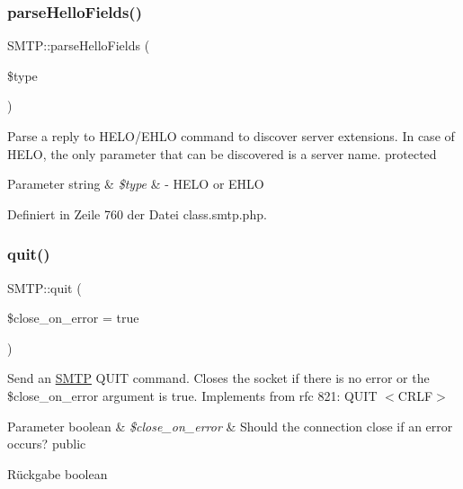 \subsubsection{\texorpdfstring{parse\+Hello\+Fields()}{parseHelloFields()}}
{\footnotesize\ttfamily S\+M\+T\+P\+::parse\+Hello\+Fields (\begin{DoxyParamCaption}\item[{}]{\$type }\end{DoxyParamCaption})\hspace{0.3cm}{\ttfamily [protected]}}

Parse a reply to H\+E\+L\+O/\+E\+H\+LO command to discover server extensions. In case of H\+E\+LO, the only parameter that can be discovered is a server name.  protected 
\begin{DoxyParams}[1]{Parameter}
string & {\em \$type} & -\/ \textquotesingle{}H\+E\+LO\textquotesingle{} or \textquotesingle{}E\+H\+LO\textquotesingle{} \\
\hline
\end{DoxyParams}


Definiert in Zeile 760 der Datei class.\+smtp.\+php.

\mbox{\label{class_s_m_t_p_a4125d346dff5846eb228cc3db180b254}} 
\subsubsection{\texorpdfstring{quit()}{quit()}}
{\footnotesize\ttfamily S\+M\+T\+P\+::quit (\begin{DoxyParamCaption}\item[{}]{\$close\+\_\+on\+\_\+error = {\ttfamily true} }\end{DoxyParamCaption})}

Send an \mbox{\hyperlink{class_s_m_t_p}{S\+M\+TP}} Q\+U\+IT command. Closes the socket if there is no error or the \$close\+\_\+on\+\_\+error argument is true. Implements from rfc 821\+: Q\+U\+IT $<$\+C\+R\+L\+F$>$ 
\begin{DoxyParams}[1]{Parameter}
boolean & {\em \$close\+\_\+on\+\_\+error} & Should the connection close if an error occurs?  public \\
\hline
\end{DoxyParams}
\begin{DoxyReturn}{Rückgabe}
boolean 
\end{DoxyReturn}


